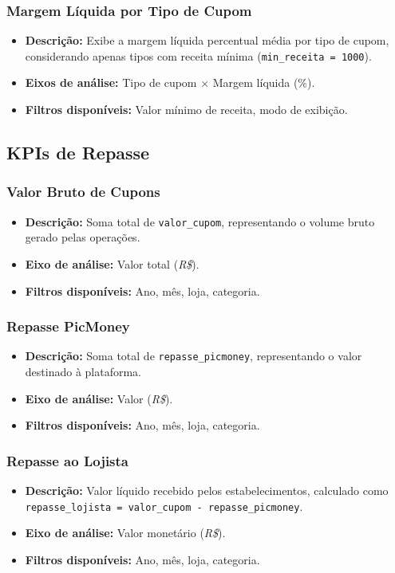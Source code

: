 \documentclass[12pt]{article}
\begin{document}
\subsubsection{Margem Líquida por Tipo de Cupom}
\begin{itemize}
    \item \textbf{Descrição:} Exibe a margem líquida percentual média por tipo de cupom, considerando apenas tipos com receita mínima (\texttt{min\_receita = 1000}).
    \item \textbf{Eixos de análise:} Tipo de cupom × Margem líquida (\%).
    \item \textbf{Filtros disponíveis:} Valor mínimo de receita, modo de exibição.
\end{itemize}

\subsection{KPIs de Repasse}

\subsubsection{Valor Bruto de Cupons}
\begin{itemize}
    \item \textbf{Descrição:} Soma total de \texttt{valor\_cupom}, representando o volume bruto gerado pelas operações.
    \item \textbf{Eixo de análise:} Valor total (\textit{R\$}).
    \item \textbf{Filtros disponíveis:} Ano, mês, loja, categoria.
\end{itemize}

\subsubsection{Repasse PicMoney}
\begin{itemize}
    \item \textbf{Descrição:} Soma total de \texttt{repasse\_picmoney}, representando o valor destinado à plataforma.
    \item \textbf{Eixo de análise:} Valor (\textit{R\$}).
    \item \textbf{Filtros disponíveis:} Ano, mês, loja, categoria.
\end{itemize}

\subsubsection{Repasse ao Lojista}
\begin{itemize}
    \item \textbf{Descrição:} Valor líquido recebido pelos estabelecimentos, calculado como \texttt{repasse\_lojista = valor\_cupom - repasse\_picmoney}.
    \item \textbf{Eixo de análise:} Valor monetário (\textit{R\$}).
    \item \textbf{Filtros disponíveis:} Ano, mês, loja, categoria.
\end{itemize}
\end{document}
